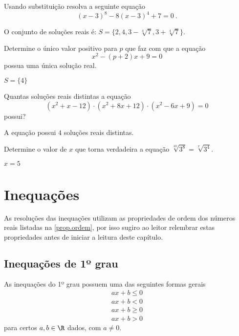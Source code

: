 \begin{exer}
Usando substituição resolva a seguinte equação \[(x-3)^8 - 8(x-3)^4 + 7=0 \ . \]
\end{exer}
\begin{resp}
O conjunto de soluções reais é:
 $S= \{2, 4, 3 - \sqrt[4]{7}, 3 + \sqrt[4]{7} \}$.
\end{resp}

\begin{exer}
Determine o único valor positivo para $p$ que faz com que a equação 
\[x^2 - (p+2)x + 9= 0\]
possua uma única solução real.
\end{exer}
\begin{resp}
 $S= \{4\}$
\end{resp}

\begin{exer}
Quantas soluções reais distintas a equação
\[(x^2 + x - 12)\cdot (x^2 + 8x + 12) \cdot (x^2 - 6x + 9)= 0\]
possui?
\end{exer}
\begin{resp}
  A equação possui $4$ soluções reais distintas.
\end{resp}

\begin{exer}
Determine o valor de $x$ que torna verdadeira a equação $\sqrt[10]{3^8}= \sqrt[x]{3^4}$.
\end{exer}
\begin{resp}
  $x= 5$
\end{resp}




\chapter{Inequações}

 As resoluções das inequações utilizam as propriedades de ordem dos números reais listadas na \autoref{prop.ordem}, por isso sugiro ao leitor relembrar estas propriedades antes de iniciar a leitura deste capítulo.

 \section{Inequações de 1º grau}
 
 \vskip0.3cm
 \colorbox{azul}{
 \begin{minipage}{0.9\linewidth}
 \begin{center}
  As inequações do 1º grau possuem uma das seguintes formas gerais
 \begin{eqnarray*}
 ax+b \leq 0 \\
 ax+b < 0 \\
 ax+b \geq 0 \\
 ax+b >0 
 \end{eqnarray*}  
 para certos $a, b \in \R$ dados, com $a \neq 0$.
 \end{center}
 \end{minipage}}
 \vskip0.3cm
  

